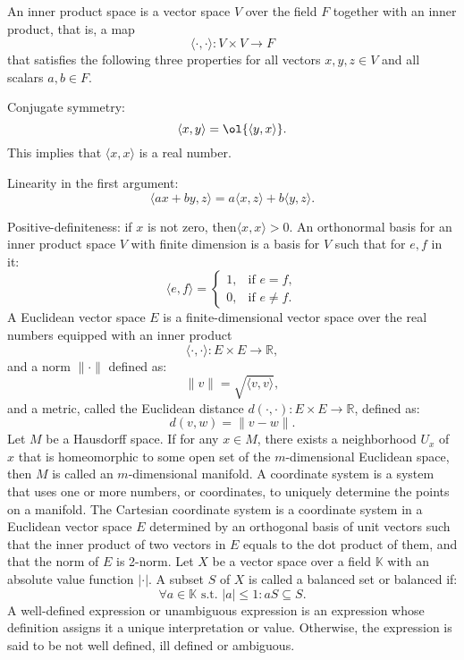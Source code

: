\documentclass[a4paper,12pt]{article}
\begin{document}
An inner product space is a vector space $V$ over the field $F$ together with an inner product, that is, a map
\[\langle \cdot ,\cdot \rangle \colon V\times V\to F\]
that satisfies the following three properties for all vectors $x,y,z\in V$ and all scalars $a,b\in F$.
\bit
\item Conjugate symmetry: 
\[\langle x,y\rangle =\ol{\langle y,x\rangle }.\]
This implies that $\langle x,x\rangle$ is a real number.
\item Linearity in the first argument:
\[ \langle ax+by,z\rangle =a\langle x,z\rangle +b\langle y,z\rangle .\]
\item Positive-definiteness: if $x$ is not zero, then$\langle x,x\rangle >0$.
\eit
{}
An orthonormal basis for an inner product space $V$ with finite dimension is a basis for $V$ such that for $e,f$ in it:
\[\langle e,f \rangle = \begin{cases}1, & \text{if } e=f,\\0, & \text{if } e\neq f.\end{cases}\]
A Euclidean vector space $E$ is a finite-dimensional vector space over the real numbers equipped with an inner product 
\[\langle \cdot ,\cdot \rangle \colon E\times E\to\mathbb{R},\]
and a norm $\|\cdot\|$ defined as:
\[\|v\|=\sqrt{\langle v,v\rangle},\]
and a metric, called the Euclidean distance $d(\cdot,\cdot)\colon E\times E\to\mathbb{R}$, defined as:
\[d(v,w)=\|v-w\|.\]
Let $M$ be a Hausdorff space. If for any $x\in M$, there exists a neighborhood $U_x$ of $x$ that is homeomorphic to some open set of the $m$-dimensional Euclidean space, then $M$ is called an $m$-dimensional manifold.
A coordinate system is a system that uses one or more numbers, or coordinates, to uniquely determine the points on a manifold.
The Cartesian coordinate system is a coordinate system in a Euclidean vector space $E$ determined by an orthogonal basis of unit vectors such that the inner product of two vectors in $E$ equals to the dot product of them, and that the norm of $E$ is 2-norm.
Let $X$ be a vector space over a field $\mathbb{K}$ with an absolute value function $|\cdot |$. A subset $S$ of $X$ is called a balanced set or balanced if:
\[\forall a\in\mathbb{K}\text{ s.t. }|a|\leq 1\colon aS\subseteq S.\]
A well-defined expression or unambiguous expression is an expression whose definition assigns it a unique interpretation or value. Otherwise, the expression is said to be not well defined, ill defined or ambiguous.
\end{document}
